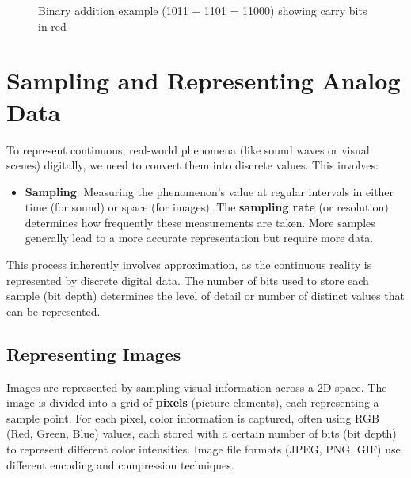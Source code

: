 \documentclass[11pt,oneside]{book}
\begin{document}
\begin{figure}[h!]
    \centering
    \caption{Binary addition example (1011 + 1101 = 11000) showing carry bits in red}
    \label{fig:binary-addition}
\end{figure}

\section{Sampling and Representing Analog Data}
\label{sec:sampling}
To represent continuous, real-world phenomena (like sound waves or visual scenes) digitally, we need to convert them into discrete values. This involves:
\begin{itemize}
    \item \textbf{Sampling}: Measuring the phenomenon's value at regular intervals in either time (for sound) or space (for images). The \textbf{sampling rate} (or resolution) determines how frequently these measurements are taken. More samples generally lead to a more accurate representation but require more data.
\end{itemize}
This process inherently involves approximation, as the continuous reality is represented by discrete digital data. The number of bits used to store each sample (bit depth) determines the level of detail or number of distinct values that can be represented.

\subsection*{Representing Images}
Images are represented by sampling visual information across a 2D space. The image is divided into a grid of \textbf{pixels} (picture elements), each representing a sample point. For each pixel, color information is captured, often using RGB (Red, Green, Blue) values, each stored with a certain number of bits (bit depth) to represent different color intensities. Image file formats (JPEG, PNG, GIF) use different encoding and compression techniques.
\end{document}
